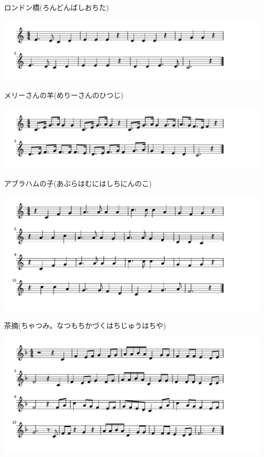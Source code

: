 \documentclass[a4paper]{ltjsarticle}
\begin{document}
\vspace{-10mm} \hspace{10mm}
ロンドン橋(ろんどんばしおちた)

\includegraphics[clip]{marysanno_crop.pdf}

\vspace{-10mm} \hspace{10mm}
メリーさんの羊(めりーさんのひつじ)

\includegraphics[clip]{abrahamunoko_crop.pdf}

\vspace{-10mm} \hspace{10mm}
アブラハムの子(あぶらはむにはしちにんのこ)

\includegraphics[clip]{chatsumi_crop.pdf}

\vspace{-10mm} \hspace{10mm}
茶摘(ちゃつみ。なつもちかづくはちじゅうはちや)

\includegraphics[clip]{okinafurudokei_crop.pdf}
\end{document}
